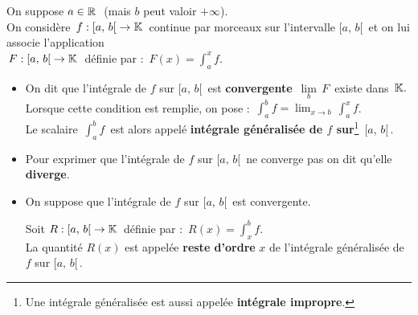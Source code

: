 On suppose \(a\in\mathbb{R}\ \) (mais $b$ peut valoir \(+\infty\)).\vspace{0.2cm}\\
On considère \(\,f:[a,\,b[\;\to\mathbb{K}\,\) continue par morceaux sur l'intervalle \([a,\,b[\,\) et on lui associe l'application\vspace{0.1cm}\\
\(\,F:[a,\,b[\;\to\mathbb{K}\;\) définie par : \(\,\displaystyle F(x)=\int_{a}^{x}f\).
\begin{itemize}[leftmargin=0.5cm, label=•]
    \item On dit que l'intégrale de $f$ sur \([a,\,b[\,\) est \textbf{convergente} \ssi \(\,\underset{b}{\lim}\,F\,\) existe dans \(\,\mathbb{K}.\)\\
    Lorsque cette condition est remplie, on pose : \(\,\displaystyle \int_{a}^{b}\!f=\lim_{x\to b}\,\int_{a}^{x}\!f\).\\
    Le scalaire \(\,\displaystyle \int_{a}^{b}\!f\,\) est alors appelé \textbf{intégrale généralisée de $f$ sur}\footnote{Une intégrale généralisée est aussi appelée \textbf{intégrale impropre}.} \(\,[a,\,b[\,.\)\vspace{0.2cm}

    \item Pour exprimer que l'intégrale de $f$ sur \([a,\,b[\,\) ne converge pas on dit qu'elle \textbf{diverge}.\vspace{0.4cm}
    
    \item On suppose que l'intégrale de $f$ sur \([a,\,b[\,\) est convergente.\vspace{-0.2cm}
    
    \hspace{4cm}Soit \(R:[a,\,b[\;\to\mathbb{K}\,\) définie par : \(\,\displaystyle R(x)=\int_{x}^{b}\!f\).\vspace{0.1cm}\\
    La quantité \(R(x)\) est appelée \textbf{reste d'ordre} $x$ de l'intégrale généralisée de $f$ sur \([a,\,b[\,\).
\end{itemize}

\vspace{2cm}

